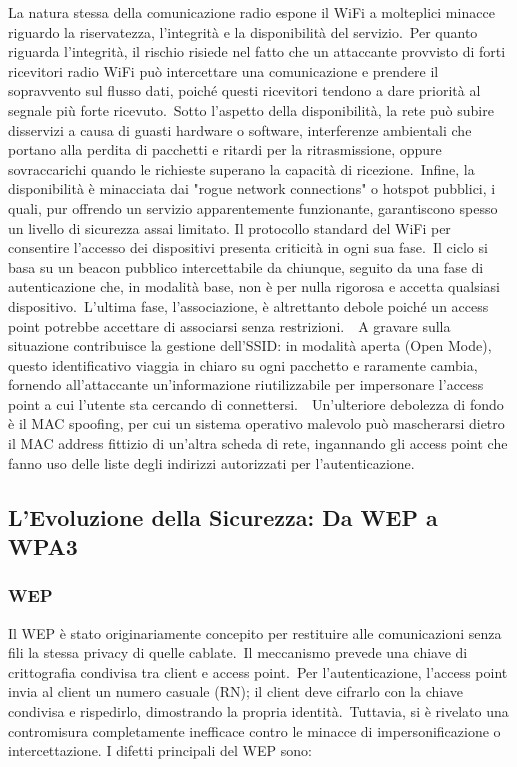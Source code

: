 \documentclass{article}
\begin{document}
La natura stessa della comunicazione radio espone il WiFi a molteplici minacce riguardo la riservatezza, l'integrità e la disponibilità del servizio. Per quanto riguarda l'integrità, il rischio risiede nel fatto che un attaccante provvisto di forti ricevitori radio WiFi può intercettare una comunicazione e prendere il sopravvento sul flusso dati, poiché questi ricevitori tendono a dare priorità al segnale più forte ricevuto. Sotto l'aspetto della disponibilità, la rete può subire disservizi a causa di guasti hardware o software, interferenze ambientali che portano alla perdita di pacchetti e ritardi per la ritrasmissione, oppure sovraccarichi quando le richieste superano la capacità di ricezione. Infine, la disponibilità è minacciata dai "rogue network connections" o hotspot pubblici, i quali, pur offrendo un servizio apparentemente funzionante, garantiscono spesso un livello di sicurezza assai limitato. Il protocollo standard del WiFi per consentire l'accesso dei dispositivi presenta criticità in ogni sua fase. Il ciclo si basa su un beacon pubblico intercettabile da chiunque, seguito da una fase di autenticazione che, in modalità base, non è per nulla rigorosa e accetta qualsiasi dispositivo. L'ultima fase, l'associazione, è altrettanto debole poiché un access point potrebbe accettare di associarsi senza restrizioni.  A gravare sulla situazione contribuisce la gestione dell'SSID: in modalità aperta (Open Mode), questo identificativo viaggia in chiaro su ogni pacchetto e raramente cambia, fornendo all'attaccante un'informazione riutilizzabile per impersonare l'access point a cui l'utente sta cercando di connettersi.  Un'ulteriore debolezza di fondo è il MAC spoofing, per cui un sistema operativo malevolo può mascherarsi dietro il MAC address fittizio di un'altra scheda di rete, ingannando gli access point che fanno uso delle liste degli indirizzi autorizzati per l'autenticazione.

\subsection*{L'Evoluzione della Sicurezza: Da WEP a WPA3}

\subsubsection*{WEP}

Il WEP è stato originariamente concepito per restituire alle comunicazioni senza fili la stessa privacy di quelle cablate. Il meccanismo prevede una chiave di crittografia condivisa tra client e access point. Per l'autenticazione, l'access point invia al client un numero casuale (RN); il client deve cifrarlo con la chiave condivisa e rispedirlo, dimostrando la propria identità. Tuttavia, si è rivelato una contromisura completamente inefficace contro le minacce di impersonificazione o intercettazione. I difetti principali del WEP sono:
\end{document}
